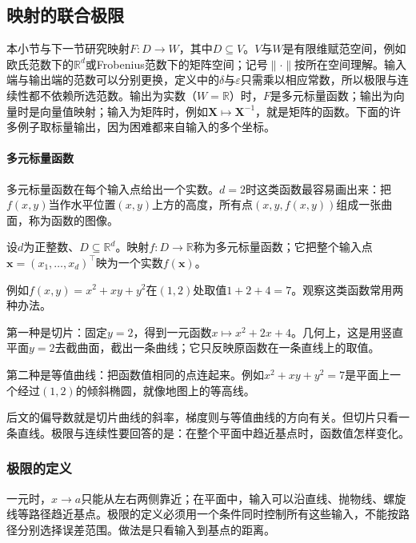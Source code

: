 \subsection{映射的联合极限}
\label{sec:multivariable-joint-limit-section}

本小节与下一节研究映射$F:D\to W$，其中$D\subseteq V$。$V$与$W$是有限维赋范空间，例如欧氏范数下的$\mathbb R^d$或Frobenius范数下的矩阵空间；记号$\lVert\cdot\rVert$按所在空间理解。输入端与输出端的范数可以分别更换，定义中的$\delta$与$\varepsilon$只需乘以相应常数，所以极限与连续性都不依赖所选范数。输出为实数（$W=\mathbb R$）时，$F$是多元标量函数；输出为向量时是向量值映射；输入为矩阵时，例如$\bm X\mapsto\bm X^{-1}$，就是矩阵的函数。下面的许多例子取标量输出，因为困难都来自输入的多个坐标。

\paragraph{多元标量函数}
多元标量函数在每个输入点给出一个实数。$d=2$时这类函数最容易画出来：把$f(x,y)$当作水平位置$(x,y)$上方的高度，所有点$(x,y,f(x,y))$组成一张曲面，称为函数的图像。
\begin{definition}[多元标量函数]
\label{def:multivariable-scalar-function}
设$d$为正整数、$D\subseteq\mathbb R^d$。映射$f:D\to\mathbb R$称为多元标量函数；它把整个输入点$\bm x=(x_1,\ldots,x_d)^\top$映为一个实数$f(\bm x)$。
\end{definition}
例如$f(x,y)=x^2+xy+y^2$在$(1,2)$处取值$1+2+4=7$。观察这类函数常用两种办法。

第一种是切片：固定$y=2$，得到一元函数$x\mapsto x^2+2x+4$。几何上，这是用竖直平面$y=2$去截曲面，截出一条曲线；它只反映原函数在一条直线上的取值。

第二种是等值曲线：把函数值相同的点连起来。例如$x^2+xy+y^2=7$是平面上一个经过$(1,2)$的倾斜椭圆，就像地图上的等高线。

后文的偏导数就是切片曲线的斜率，梯度则与等值曲线的方向有关。但切片只看一条直线。极限与连续性要回答的是：在整个平面中趋近基点时，函数值怎样变化。

\subsubsection{极限的定义}
\label{sec:multivariable-joint-limits}

一元时，$x\to a$只能从左右两侧靠近；在平面中，输入可以沿直线、抛物线、螺旋线等路径趋近基点。极限的定义必须用一个条件同时控制所有这些输入，不能按路径分别选择误差范围。做法是只看输入到基点的距离。

